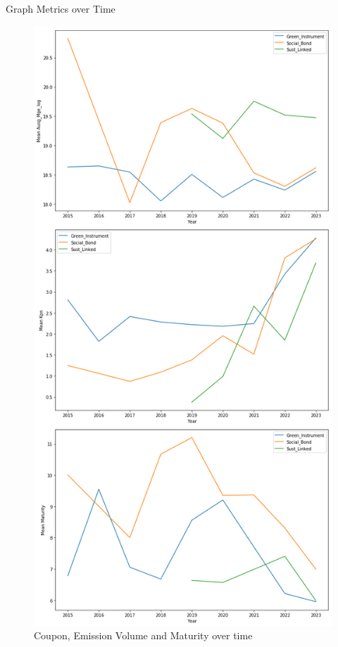 \documentclass[
	8pt, %
]{beamer}
\begin{document}
\begin{frame}{Graph Metrics over Time}
    \begin{figure}[H]
    \centering
    \includegraphics[width=0.8\linewidth, height=0.8\textheight, keepaspectratio]{Metrics_overtime.png}
    \caption{Coupon, Emission Volume and Maturity over time}
\label{fig:Metrics}
\end{figure}
\end{frame}
\end{document}
